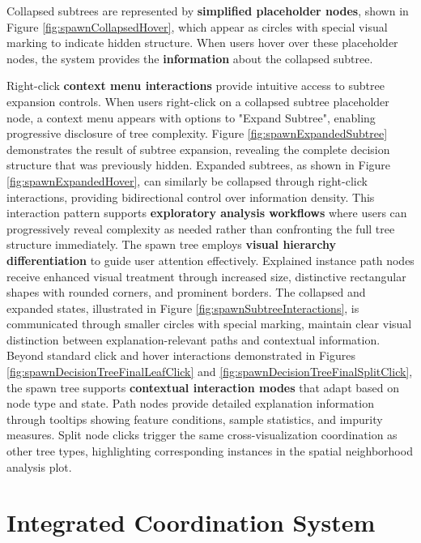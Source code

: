 Collapsed subtrees are represented by \textbf{simplified placeholder nodes}, shown in Figure \ref{fig:spawnCollapsedHover}, which appear as circles with special visual marking to indicate hidden structure. When users hover over these placeholder nodes, the system provides the \textbf{information} about the collapsed subtree.

Right-click \textbf{context menu interactions} provide intuitive access to subtree expansion controls. When users right-click on a collapsed subtree placeholder node, a context menu appears with options to "Expand Subtree", enabling progressive disclosure of tree complexity. Figure \ref{fig:spawnExpandedSubtree} demonstrates the result of subtree expansion, revealing the complete decision structure that was previously hidden. Expanded subtrees, as shown in Figure \ref{fig:spawnExpandedHover}, can similarly be collapsed through right-click interactions, providing bidirectional control over information density. This interaction pattern supports \textbf{exploratory analysis workflows} where users can progressively reveal complexity as needed rather than confronting the full tree structure immediately.
% 
The spawn tree employs \textbf{visual hierarchy differentiation} to guide user attention effectively. Explained instance path nodes receive enhanced visual treatment through increased size, distinctive rectangular shapes with rounded corners, and prominent borders. The collapsed and expanded states, illustrated in Figure \ref{fig:spawnSubtreeInteractions}, is communicated through smaller circles with special marking, maintain clear visual distinction between explanation-relevant paths and contextual information.
% 
Beyond standard click and hover interactions demonstrated in Figures \ref{fig:spawnDecisionTreeFinalLeafClick} and \ref{fig:spawnDecisionTreeFinalSplitClick}, the spawn tree supports \textbf{contextual interaction modes} that adapt based on node type and state. Path nodes provide detailed explanation information through tooltips showing feature conditions, sample statistics, and impurity measures. Split node clicks trigger the same cross-visualization coordination as other tree types, highlighting corresponding instances in the spatial neighborhood analysis plot. 


\section{Integrated Coordination System}

